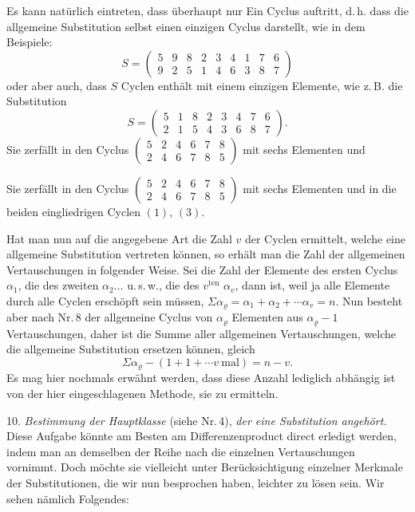 \documentclass[11pt]{article}
\providecommand{\weberpage}[1]{}
\providecommand{\weq}[2]{\begin{equation}\tag{#1}#2\end{equation}}
\let\Sigma\varSigma
\begin{document}
Es kann natürlich eintreten, dass überhaupt nur Ein Cyclus auftritt, d.\,h. dass die allgemeine Substitution selbst einen einzigen Cyclus darstellt, wie in dem Beispiele:
\weq{2}{S = \begin{pmatrix} 5 & 9 & 8 & 2 & 3 & 4 & 1 & 7 & 6 \\ 9 & 2 & 5 & 1 & 4 & 6 & 3 & 8 & 7 \end{pmatrix}}
oder aber auch, dass $S$ Cyclen enthält mit einem einzigen Elemente, wie z.\,B. die Substitution
\weq{3}{S = \begin{pmatrix} 5 & 1 & 8 & 2 & 3 & 4 & 7 & 6 \\ 2 & 1 & 5 & 4 & 3 & 6 & 8 & 7 \end{pmatrix}.}
Sie zerfällt in den Cyclus $\begin{pmatrix} 5 & 2 & 4 & 6 & 7 & 8 \\ 2 & 4 & 6 & 7 & 8 & 5 \end{pmatrix}$ mit sechs Elementen und


\weberpage{11}
Sie zerfällt in den Cyclus $\begin{pmatrix} 5 & 2 & 4 & 6 & 7 & 8 \\ 2 & 4 & 6 & 7 & 8 & 5 \end{pmatrix}$ mit sechs Elementen und in die beiden eingliedrigen Cyclen $(1)$, $(3)$.

Hat man nun auf die angegebene Art die Zahl $v$ der Cyclen ermittelt, welche eine allgemeine Substitution vertreten können, so erhält man die Zahl der allgemeinen Vertauschungen in folgender Weise. Sei die Zahl der Elemente des ersten Cyclus $\alpha_1$, die des zweiten $\alpha_2 \ldots$ u.\,s.\,w., die des $v^{\mathrm{ten}}$ $\alpha_v$, dann ist, weil ja alle Elemente durch alle Cyclen erschöpft sein müssen, $\Sigma\alpha_\varrho = \alpha_1 + \alpha_2 + \cdots \alpha_v = n$. Nun besteht aber nach Nr.\,8 der allgemeine Cyclus von $\alpha_\varrho$ Elementen aus $\alpha_\varrho - 1$ Vertauschungen, daher ist die Summe aller allgemeinen Vertauschungen, welche die allgemeine Substitution ersetzen können, gleich
\[
\Sigma\alpha_\varrho - (1 + 1 + \cdots v\ \text{mal}) = n - v.
\]
Es mag hier nochmals erwähnt werden, dass diese Anzahl lediglich abhängig ist von der hier eingeschlagenen Methode, sie zu ermitteln.

10. \emph{Bestimmung der Hauptklasse} (siehe Nr.\,4), \emph{der eine Substitution angehört.} Diese Aufgabe könnte am Besten am Differenzenproduct direct erledigt werden, indem man an demselben der Reihe nach die einzelnen Vertauschungen vornimmt. Doch möchte sie vielleicht unter Berücksichtigung einzelner Merkmale der Substitutionen, die wir nun besprochen haben, leichter zu lösen sein. Wir sehen nämlich Folgendes:
\end{document}
